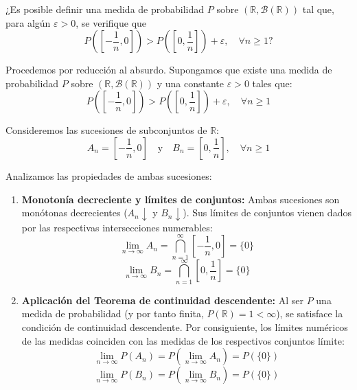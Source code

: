 \begin{problema}
¿Es posible definir una medida de probabilidad $P$ sobre $(\mathbb{R}, \mathcal{B}(\mathbb{R}))$ tal que, para algún $\varepsilon > 0$, se verifique que
\[
    P\left(\left[-\frac{1}{n}, 0\right]\right) > P\left(\left[0, \frac{1}{n}\right]\right) + \varepsilon, \quad \forall n \ge 1?
\]

\tcblower

Procedemos por reducción al absurdo. Supongamos que existe una medida de probabilidad $P$ sobre $(\mathbb{R}, \mathcal{B}(\mathbb{R}))$ y una constante $\varepsilon > 0$ tales que:
\[
    P\left(\left[-\frac{1}{n}, 0\right]\right) > P\left(\left[0, \frac{1}{n}\right]\right) + \varepsilon, \quad \forall n \ge 1
\]

Consideremos las sucesiones de subconjuntos de $\mathbb{R}$:
\[
    A_n = \left[-\frac{1}{n}, 0\right] \quad \text{y} \quad B_n = \left[0, \frac{1}{n}\right], \quad \forall n \ge 1
\]

Analizamos las propiedades de ambas sucesiones:
\begin{enumerate}[label=\arabic*.]
    \item \textbf{Monotonía decreciente y límites de conjuntos:}
    Ambas sucesiones son monótonas decrecientes ($A_n \downarrow$ y $B_n \downarrow$). Sus límites de conjuntos vienen dados por las respectivas intersecciones numerables:
    \[
        \lim_{n \to \infty} A_n = \bigcap_{n=1}^\infty \left[-\frac{1}{n}, 0\right] = \{0\}
    \]
    \[
        \lim_{n \to \infty} B_n = \bigcap_{n=1}^\infty \left[0, \frac{1}{n}\right] = \{0\}
    \]

    \item \textbf{Aplicación del Teorema de continuidad descendente:}
    Al ser $P$ una medida de probabilidad (y por tanto finita, $P(\mathbb{R}) = 1 < \infty$), se satisface la condición de continuidad descendente. Por consiguiente, los límites numéricos de las medidas coinciden con las medidas de los respectivos conjuntos límite:
    \[
        \lim_{n \to \infty} P(A_n) = P\left( \lim_{n \to \infty} A_n \right) = P(\{0\})
    \]
    \[
        \lim_{n \to \infty} P(B_n) = P\left( \lim_{n \to \infty} B_n \right) = P(\{0\})
    \]
\end{enumerate}

\begin{center}
    \vspace{0.2cm}
    \vspace{0.2cm}
\end{center}


\end{problema}
